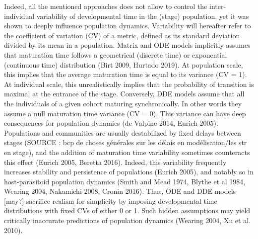 \documentclass[12pt,a4paper,onecolumn]{article}
\begin{document}
\tabto{1 cm}  Indeed, all the mentioned approaches does not allow to control the inter-individual variability of developmental time in the (stage) population, yet it was shown to deeply influence population dynamics. Variability will hereafter refer to the coefficient of variation (CV) of a metric, defined as its standard deviation divided by its mean in a population. Matrix and ODE models implicitly assumes that maturation time follows a geometrical (discrete time) or exponential (continuous time) distribution (Birt 2009, Hurtado 2019). At population scale, this implies that the average maturation time is equal to its variance (CV = 1). At individual scale, this unrealistically implies that the probability of transition is maximal at the entrance of the stage. Conversely, DDE models assume that all the individuals of a given cohort maturing synchronically. In other words they assume a null maturation time variance (CV = 0). This variance can have deep consequences for population dynamics (de Valpine 2014, Eurich 2005). Populations and communities are usually destabilized by fixed delays between stages (SOURCE : bcp de choses générales sur les délais en modélisation/les str en stage), and the addition of maturation time variability sometimes counteracts this effect (Eurich 2005, Beretta 2016). Indeed, this variability frequently increases stability and persistence of populations (Eurich 2005), and notably so  in host-parasitoid population dynamics (Smith and Mead 1974, Blythe et al 1984, Wearing 2004, Nakamichi 2008, Cronin 2016). Thus, ODE and DDE models [may?] sacrifice realism for simplicity by imposing developmental time distributions with fixed CVs of either 0 or 1. Such hidden assumptions may yield critically inaccurate predictions of population dynamics (Wearing 2004, Xu et al. 2010).  \\
\end{document}
